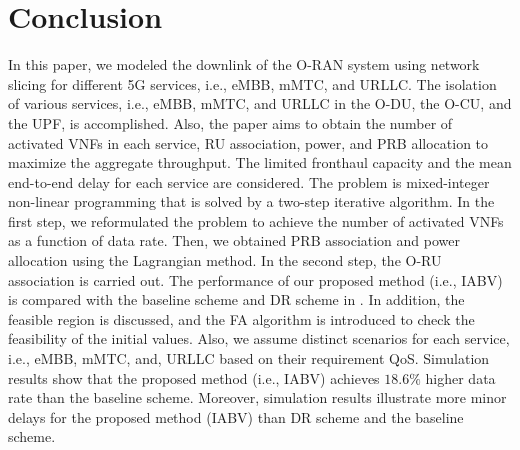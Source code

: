 \documentclass[lettersize,journal]{IEEEtran}
\begin{document}
\section{Conclusion}\label{conc}
In this  paper, we modeled the downlink of the O-RAN system using network slicing for different 5G services, i.e., eMBB, mMTC, and URLLC.
The isolation of various services, i.e., eMBB, mMTC, and URLLC in the O-DU, the O-CU, and the UPF, is accomplished.
Also, the paper aims to obtain the number of activated VNFs in each service, RU association, power, and PRB allocation to maximize the aggregate throughput. The limited fronthaul capacity and the mean end-to-end delay for each service are considered.
The problem is mixed-integer non-linear programming that is solved by a two-step iterative algorithm.
In the first step, we reformulated the problem to achieve the number of activated VNFs as a function of data rate. Then, we obtained PRB association and power allocation using the Lagrangian method.
In the second step, the O-RU association is carried out.
The performance of our proposed method (i.e., IABV) is compared with the baseline scheme and DR scheme in \cite{lee2018dynamic}.
In addition, the feasible region is discussed, and the FA algorithm is introduced to check the feasibility of the initial values.
Also, we assume distinct scenarios for each service, i.e., eMBB, mMTC, and, URLLC based on their requirement QoS.
Simulation results show that the proposed method (i.e., IABV) achieves $18.6\%$ higher data rate than the baseline scheme.
Moreover, simulation results illustrate more minor delays for the proposed method (IABV) than DR scheme and the baseline scheme.
\vspace*{-0.7em}


%
\end{document}
